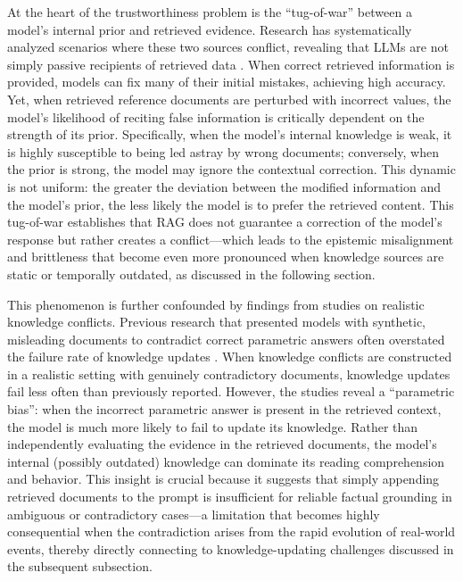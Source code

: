 \documentclass[11pt]{article}
\begin{document}
At the heart of the trustworthiness problem is the ``tug-of-war'' between a model's internal prior and retrieved evidence. Research has systematically analyzed scenarios where these two sources conflict, revealing that LLMs are not simply passive recipients of retrieved data \cite{ref238}. When correct retrieved information is provided, models can fix many of their initial mistakes, achieving high accuracy. Yet, when retrieved reference documents are perturbed with incorrect values, the model's likelihood of reciting false information is critically dependent on the strength of its prior. Specifically, when the model's internal knowledge is weak, it is highly susceptible to being led astray by wrong documents; conversely, when the prior is strong, the model may ignore the contextual correction. This dynamic is not uniform: the greater the deviation between the modified information and the model's prior, the less likely the model is to prefer the retrieved content. This tug-of-war establishes that RAG does not guarantee a correction of the model's response but rather creates a conflict---which leads to the epistemic misalignment and brittleness that become even more pronounced when knowledge sources are static or temporally outdated, as discussed in the following section.

This phenomenon is further confounded by findings from studies on realistic knowledge conflicts. Previous research that presented models with synthetic, misleading documents to contradict correct parametric answers often overstated the failure rate of knowledge updates \cite{ref9}. When knowledge conflicts are constructed in a realistic setting with genuinely contradictory documents, knowledge updates fail less often than previously reported. However, the studies reveal a ``parametric bias'': when the incorrect parametric answer is present in the retrieved context, the model is much more likely to fail to update its knowledge. Rather than independently evaluating the evidence in the retrieved documents, the model's internal (possibly outdated) knowledge can dominate its reading comprehension and behavior. This insight is crucial because it suggests that simply appending retrieved documents to the prompt is insufficient for reliable factual grounding in ambiguous or contradictory cases---a limitation that becomes highly consequential when the contradiction arises from the rapid evolution of real-world events, thereby directly connecting to knowledge-updating challenges discussed in the subsequent subsection.
\end{document}
